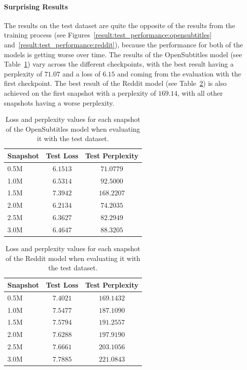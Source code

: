 \paragraph{Surprising Results} The results on the test dataset are quite the opposite of the results from the training process (see Figures~\ref{result:test_performance:opensubtitles} and~\ref{result:test_performance:reddit}), because the performance for both of the models is getting worse over time. The results of the OpenSubtitles model (see Table~\ref{results:test_metrics:opensubtitles}) vary across the different checkpoints, with the best result having a perplexity of $71.07$ and a loss of $6.15$ and coming from the evaluation with the first checkpoint. The best result of the Reddit model (see Table~\ref{results:test_metrics:reddit}) is also achieved on the first snapshot with a perplexity of $169.14$, with all other snapshots having a worse perplexity.
\\
\begin{table}[H]
	\centering
	\begin{adjustbox}{max width=\textwidth}
		\begin{tabular}{l|cc}
			\toprule
			Snapshot & Test Loss & Test Perplexity\\
			\midrule
			0.5M & $6.1513$ & $71.0779$\\
			1.0M & $6.5314$ & $92.5000$\\
			1.5M & $7.3942$ & $168.2207$\\
			2.0M & $6.2134$ & $74.2035$\\
			2.5M & $6.3627$ & $82.2949$\\
			3.0M & $6.4647$ & $88.3205$\\
			\bottomrule
		\end{tabular}
	\end{adjustbox}
	\caption{Loss and perplexity values for each snapshot of the OpenSubtitles model when evaluating it with the test dataset.}
	\label{results:test_metrics:opensubtitles}
\end{table}

\begin{table}[H]
	\centering
	\begin{adjustbox}{max width=\textwidth}
		\begin{tabular}{l|cc}
			\toprule
			Snapshot & Test Loss & Test Perplexity\\
			\midrule
			0.5M & $7.4021$ & $169.1432$\\
			1.0M & $7.5477$ & $187.1090$\\
			1.5M & $7.5794$ & $191.2557$\\
			2.0M & $7.6288$ & $197.9190$\\
			2.5M & $7.6661$ & $203.1056$\\
			3.0M & $7.7885$ & $221.0843$\\
			\bottomrule
		\end{tabular}
	\end{adjustbox}
	\caption{Loss and perplexity values for each snapshot of the Reddit model when evaluating it with the test dataset.}
	\label{results:test_metrics:reddit}
\end{table}

